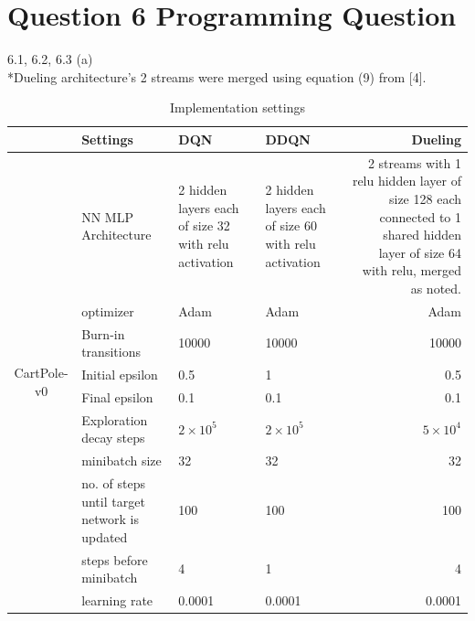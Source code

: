 \documentclass[12pt]{article}
\begin{document}
\section*{Question 6 Programming Question}
    \begin{tcolorbox}[fit,height=22cm, width=\textwidth, blank, borderline={1pt}{-2pt},nobeforeafter]
    {\large 6.1, 6.2, 6.3 (a)}\\
    *Dueling architecture's 2 streams were merged using equation (9) from [4].
	\begin{table}[H]
		\centering
		\caption{Implementation settings}
		\begin{tabular}{|c|p{7.785em}|l|l|r|}
			\cline{2-5}    \multicolumn{1}{r|}{} & Settings & \multicolumn{1}{p{7.93em}|}{DQN} & \multicolumn{1}{p{7.93em}|}{DDQN} & \multicolumn{1}{p{7.5em}|}{Dueling} \\
			\hline
			\multirow{10}[20]{*}{\begin{sideways}CartPole-v0\end{sideways}} & NN MLP Architecture  & \multicolumn{1}{p{7.93em}|}{2 hidden layers each of size 32 with relu activation} & \multicolumn{1}{p{7.93em}|}{2 hidden layers each of size 60 with relu activation} & \multicolumn{1}{p{7.93em}|}{2 streams with 1 relu hidden layer of size 128 each connected to 1 shared hidden layer of size 64 with relu, merged as noted.} \\
			\cline{2-5}          & optimizer & \multicolumn{1}{p{7.93em}|}{Adam} & \multicolumn{1}{p{7.93em}|}{Adam} & \multicolumn{1}{p{7.93em}|}{Adam} \\
			\cline{2-5}          & Burn-in transitions & 10000 & 10000 &  10000 \\
			\cline{2-5}          & Initial epsilon & 0.5   & 1     & 0.5 \\
			\cline{2-5}          & Final epsilon & 0.1   & 0.1   & 0.1 \\
			\cline{2-5}          & Exploration decay steps & \multicolumn{1}{p{7.93em}|}{$2\times10^5$} & \multicolumn{1}{p{7.93em}|}{$2\times10^5$} & \multicolumn{1}{p{7.93em}|}{$5\times10^4$} \\
			\cline{2-5}          & minibatch size & 32    & 32    & 32  \\
			\cline{2-5}          & no. of steps until target network is updated & 100   & 100   & 100  \\
			\cline{2-5}          & steps before minibatch & 4     & 1     & 4 \\
			\cline{2-5}          & learning rate & 0.0001 & 0.0001 &  0.0001 \\

\end{tabular}
\end{table}
\end{tcolorbox}
\end{document}
